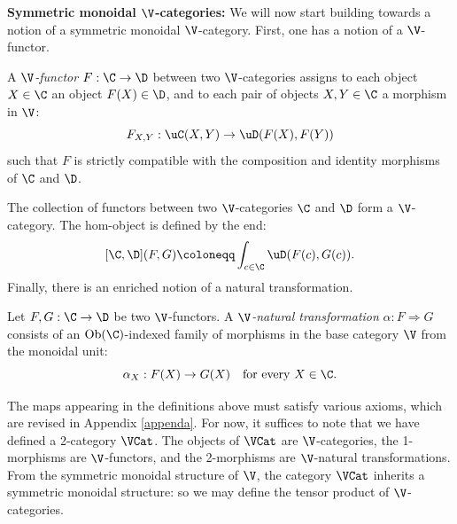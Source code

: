 \documentclass{tac}
\begin{document}
\medskip


\noindent\textbf{Symmetric monoidal $\V$-categories:}  We will now start building towards a notion of a symmetric monoidal $\V$-category.  First, one has a notion of a $\V$-functor. 
\begin{definition}
A \emph{$\V$-functor} $F: \C \to \D$ between two $\V$-categories assigns to each object $X \in \C$ an object $F(X) \in \D$, and to each pair of objects $X, Y \in \C$ a morphism in $\V$:
$$ F_{X,Y}: \uC(X, Y) \to \uD(F(X), F(Y)) $$
such that $F$ is strictly compatible with the composition and identity morphisms of $\C$ and $\D$.
\end{definition}
The collection of functors between two $\V$-categories $\C$ and $\D$ form a $\V$-category. The hom-object is defined by the end: 
$$
[\C, \D](F, G) \coloneqq \int_{c \in \C} \uD(F(c), G(c)).
$$
Finally, there is an enriched notion of a natural transformation.
\begin{definition}
Let $F, G: \C \to \D$ be two $\V$-functors. A \emph{$\V$-natural transformation} $\alpha: F \Rightarrow G$ consists of an $\operatorname{Ob}(\C)$-indexed family of morphisms in the base category $\V$ from the monoidal unit:
$$ \alpha_X: F(X) \to G(X) \quad \text{for every } X \in \C. $$
\end{definition}
The maps appearing in the definitions above must satisfy various axioms, which are revised in Appendix \ref{appenda}. For now, it suffices to note that we have defined a 2-category $\VCat$. The objects of $\VCat$ are $\V$-categories, the 1-morphisms are $\V$-functors, and the 2-morphisms are $\V$-natural transformations. From the symmetric monoidal structure of $\V$, the category $\VCat$ inherits a symmetric monoidal structure: so we may define the tensor product of $\V$-categories.
\end{document}
